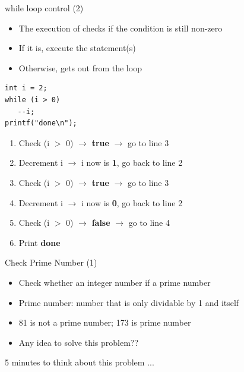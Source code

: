 \begin{frame}[fragile]{while loop control (2)}
\begin{itemize}
	\item {The execution of checks if the condition is still non-zero}
	\item {If it is, execute the statement(s)}
	\item {Otherwise, gets out from the loop}
\end{itemize}
	\begin{lstlisting}
int i = 2;
while (i > 0)
   --i;
printf("done\n");
\end{lstlisting}
\vspace{-0.15in}
\begin{enumerate}[<+(1)->]
	\item Check (i $>$ 0) $\rightarrow$ \textbf{true} $\rightarrow$ go to line 3
	\item Decrement i $\rightarrow$ i now is \textbf{1}, go back to line 2
	\item Check (i $>$ 0) $\rightarrow$ \textbf{true} $\rightarrow$ go to line 3
	\item Decrement i $\rightarrow$ i now is \textbf{0}, go back to line 2
	\item Check (i $>$ 0) $\rightarrow$ \textbf{false} $\rightarrow$ go to line 4
	\item Print \textbf{done}
\end{enumerate}
\end{frame}

\begin{frame}[fragile]{Check Prime Number (1)}
\begin{itemize}
	\item {Check whether an integer number if a prime number}
	\item {Prime number: number that is only dividable by 1 and itself}
	\item {81 is not a prime number; 173 is prime number}
	\item {Any idea to solve this problem??}
\end{itemize}

\begin{center}
	\Large{5 minutes to think about this problem ...}
\end{center}
\end{frame}

